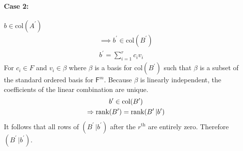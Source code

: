 \paragraph{Case 2:} $b \in \text{col}(A^\prime)$
\begin{gather}
\implies b^\prime \in \text{col}(B^\prime)\\
b^\prime = \sum\limits_{i=1}^r c_iv_i
\end{gather}
For $c_i \in F$ and $v_i\in \beta$ where $\beta$ is a basis for
$\text{col}(B^\prime)$ such that $\beta$ is a subset of the standard ordered basis
for $\mathsf{F}^m$. Because $\beta$ is linearly independent, the
coefficients of the linear combination are unique.
\begin{gather}
b^\prime \in \text{col}(B^\prime)\\
\Rightarrow \text{rank}({B^\prime}) = \text{rank}({B^\prime\,|b^\prime})
\end{gather}
It follows that all rows of $(B^\prime\,|b^\prime)$ after the
$r^{\text{th}}$  are entirely zero. Therefore $(B^\prime\,|b^\prime)$.
